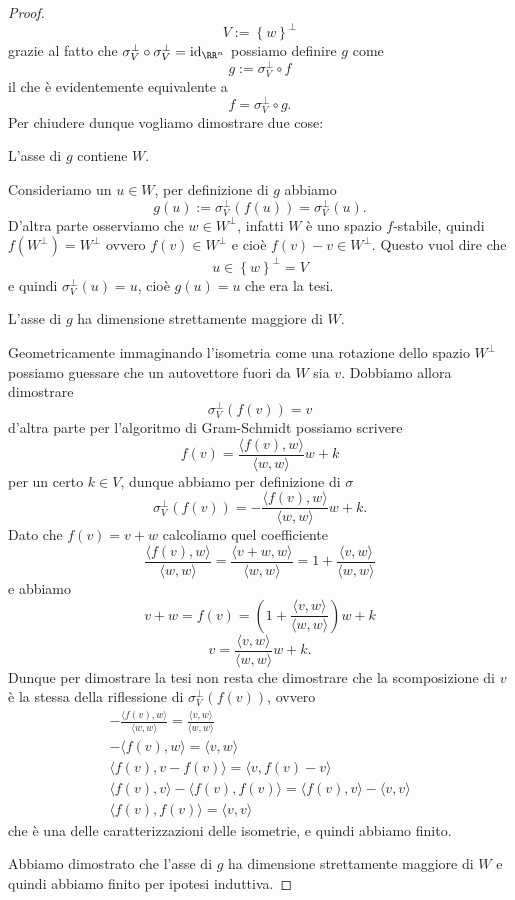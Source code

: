 \documentclass[11pt]{scrartcl}
\begin{document}
\begin{proof}
   	 	$$V:=\left\{w\right\}^\perp$$ 
   	 	grazie al fatto che $\sigma_V^\perp\circ \sigma_V^\perp=\text{id}_{\RR^n}$ possiamo definire $g$ come
   	 	$$g:=\sigma_V^\perp \circ f$$
   	 	il che è evidentemente equivalente a
   	 	$$f=\sigma_V^\perp \circ g.$$
   	 	Per chiudere dunque vogliamo dimostrare due cose:
   	 	\begin{claim}
   	 		L'asse di $g$ contiene $W$.
   	 	\end{claim}
   	 	\begin{subproof}[Sottodimostrazione]
   	 		Consideriamo un $u\in W$, per definizione di $g$ abbiamo
   	 		$$g(u):=\sigma_V^\perp\left(f(u)\right)=\sigma_V^\perp\left(u\right).$$
   	 		D'altra parte osserviamo che $w\in W^\perp$, infatti $W$ è uno spazio $f$-stabile, quindi $f(W^\perp)=W^\perp$ ovvero $f(v)\in W^\perp$ e cioè $f(v)-v\in W^\perp$. Questo vuol dire che 
   	 		$$u\in \left\{w\right\}^\perp=V$$
   	 		e quindi $\sigma_V^\perp(u)=u$, cioè $g(u)=u$ che era la tesi.
   	 	\end{subproof}
   	 	\begin{claim}
   	 		L'asse di $g$ ha dimensione strettamente maggiore di $W$.
   	 	\end{claim}
   	 	\begin{subproof}
   	 		Geometricamente immaginando l'isometria come una rotazione dello spazio $W^\perp$ possiamo guessare che un autovettore fuori da $W$ sia $v$. Dobbiamo allora dimostrare 
   	 		$$\sigma_V^\perp(f(v))=v$$
   	 		d'altra parte per l'algoritmo di Gram-Schmidt possiamo scrivere 
   	 		$$f(v)=\frac{\langle f(v),w\rangle}{\langle w,w\rangle}w+k$$
   	 		per un certo $k\in V$, dunque abbiamo per definizione di $\sigma$
   	 		$$\sigma_V^\perp(f(v))=-\frac{\langle f(v),w\rangle}{\langle w,w\rangle}w+k.$$
   	 		Dato che $f(v)=v+w$ calcoliamo quel coefficiente
   	 		$$\frac{\langle f(v),w\rangle}{\langle w,w\rangle}=\frac{\langle v+w,w\rangle}{\langle w,w\rangle}=1+\frac{\langle v,w\rangle}{\langle w,w\rangle}$$
   	 		e abbiamo
   	 		$$v+w=f(v)=\left(1+\frac{\langle v,w\rangle}{\langle w,w\rangle}\right)w+k$$
   	 		$$v=\frac{\langle v,w\rangle}{\langle w,w\rangle}w+k.$$
   	 		Dunque per dimostrare la tesi non resta che dimostrare che la scomposizione di $v$ è la stessa della riflessione di $\sigma_V^\perp(f(v))$, ovvero
   	 		\begin{gather*}
   	 			-\frac{\langle f(v),w\rangle}{\langle w,w\rangle}=\frac{\langle v,w\rangle}{\langle w,w\rangle} \\
   	 			-\langle f(v),w\rangle=\langle v,w\rangle \\
   	 			\langle f(v),v-f(v)\rangle=\langle v,f(v)-v\rangle \\
   	 			\langle f(v),v\rangle-\langle f(v),f(v)\rangle=\langle f(v),v\rangle-\langle v,v\rangle \\
   	 			\langle f(v),f(v)\rangle=\langle v,v\rangle
   	 		\end{gather*}
   	 		che è una delle caratterizzazioni delle isometrie, e quindi abbiamo finito.
   	 	\end{subproof}
   	 	Abbiamo dimostrato che l'asse di $g$ ha dimensione strettamente maggiore di $W$ e quindi abbiamo finito per ipotesi induttiva.
   	 \end{proof}
\end{document}

